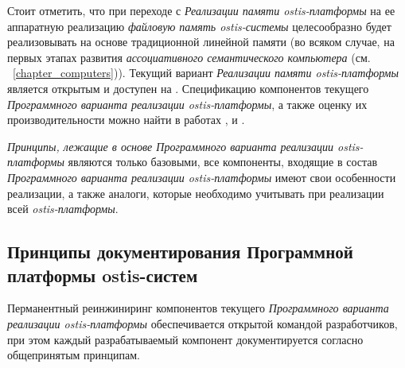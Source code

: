 Стоит отметить, что при переходе с \textit{Реализации памяти ostis-платформы} на ее аппаратную реализацию \textit{файловую память ostis-системы} целесообразно будет реализовывать на основе традиционной линейной памяти (во всяком случае, на первых этапах развития \textit{ассоциативного семантического компьютера} (см. ~\ref{chapter_computers})). Текущий вариант \textit{Реализации памяти ostis-платформы} является открытым и доступен на . Спецификацию компонентов текущего \textit{Программного варианта реализации ostis-платформы}, а также оценку их производительности можно найти в работах ,  и .

\textit{Принципы, лежащие в основе Программного варианта реализации ostis-платформы} являются только базовыми, все компоненты, входящие в состав \textit{Программного варианта реализации ostis-платформы} имеют свои особенности реализации, а также аналоги, которые необходимо учитывать при реализации всей \textit{ostis-платформы}.

\subsection{Принципы документирования Программной платформы ostis-систем}
\label{sec_soft_platform_doc_principles}

Перманентный реинжиниринг компонентов текущего \textit{Программного варианта реализации ostis-платформы} обеспечивается открытой командой разработчиков, при этом каждый разрабатываемый компонент документируется согласно общепринятым принципам.

